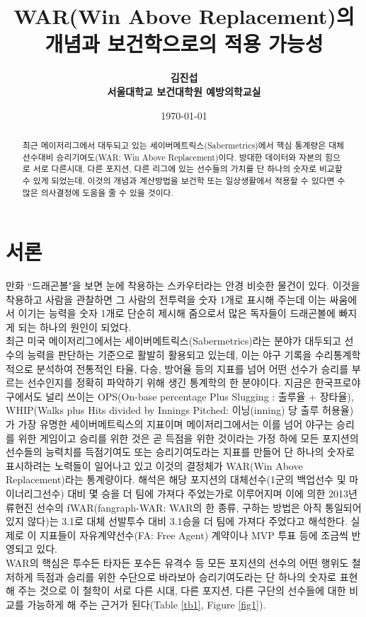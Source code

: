 \documentclass[11pt]{article}
\title{\textbf{WAR(Win Above Replacement)의 개념과 보건학으로의 적용 가능성}}
\author{
        \textbf{김진섭}  \\
                \textbf{서울대학교 보건대학원 예방의학교실}\\  
}
\date{\today}
\begin{document}
\maketitle

\begin{abstract}
최근 메이저리그에서 대두되고 있는 세이버메트릭스(Sabermetrics)에서 핵심 통계량은 대체선수대비 승리기여도(WAR: Win Above Replacement)이다. 방대한 데이터와 자본의 힘으로 서로 다른시대, 다른 포지션, 다른 리그에 있는 선수들의 가치를 단 하나의 숫자로 비교할 수 있게 되었는데, 이것의 개념과 계산방법을 보건학 또는 일상생활에서 적용할 수 있다면 수많은 의사결정에 도움을 줄 수 있을 것이다. 
\end{abstract}

\section{서론} %
\noindent 만화 ``드래곤볼"을 보면 눈에 착용하는 스카우터라는 안경 비슷한 물건이 있다. 이것을 착용하고 사람을 관찰하면 그 사람의 전투력을 숫자 1개로 표시해 주는데 이는 싸움에서 이기는 능력을 숫자 1개로 단순히 제시해 줌으로서 많은 독자들이 드래곤볼에 빠지게 되는 하나의 원인이 되었다. \\
최근 미국 메이저리그에서는 세이버메트릭스(Sabermetrics)라는 분야가 대두되고 선수의 능력을 판단하는 기준으로 활발히 활용되고 있는데, 이는 야구 기록을 수리통계학적으로 분석하여 전통적인 타율, 다승, 방어율 등의 지표를 넘어 어떤 선수가 승리를 부르는 선수인지를 정확히 파악하기 위해 생긴 통계학의 한 분야이다\cite{albert1997introduction}. 지금은 한국프로야구에서도 널리 쓰이는 OPS(On-base percentage Plus Slugging : 출루율 + 장타율), WHIP(Walks plus Hits divided by Innings Pitched: 이닝(inning) 당 출루 허용율) 가 가장 유명한 세이버메트릭스의 지표이며 메이저리그에서는 이를 넘어 야구는 승리를 위한 게임이고 승리를 위한 것은 곧 득점을 위한 것이라는 가정 하에 모든 포지션의 선수들의 능력치를 득점기여도 또는 승리기여도라는 지표를 만들어 단 하나의 숫자로 표시하려는 노력들이 일어나고 있고 이것의 결정체가 WAR(Win Above Replacement)라는 통계량이다. 해석은 해당 포지션의 대체선수(1군의 백업선수 및 마이너리그선수) 대비 몇 승을 더 팀에 가져다 주었는가로 이루어지며 이에 의한 2013년 류현진 선수의 fWAR(fangraph-WAR: WAR의 한 종류, 구하는 방법은 아직 통일되어 있지 않다)는 3.1로 대체 선발투수 대비 3.1승을 더 팀에 가져다 주었다고 해석한다\cite{WARRyuonline}. 실제로 이 지표들이 자유계약선수(FA: Free Agent) 계약이나 MVP 투표 등에 조금씩 반영되고 있다. \\
WAR의 핵심은 투수든 타자든 포수든 유격수 등 모든 포지션의 선수의 어떤 행위도 철저하게 득점과 승리를 위한 수단으로 바라보아 승리기여도라는 단 하나의 숫자로 표현해 주는 것으로 이 철학이 서로 다른 시대, 다른 포지션, 다른 구단의 선수들에 대한 비교를 가능하게 해 주는 근거가 된다(Table \ref{tb1}, Figure \ref{fig1}). \\
\end{document}
